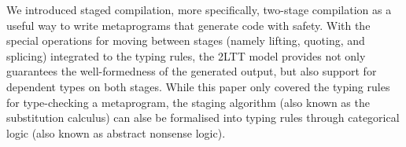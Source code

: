We introduced staged compilation, more specifically, two-stage compilation as a useful way to write metaprograms that generate code with safety. With the special operations for moving between stages (namely lifting, quoting, and splicing) integrated to the typing rules, the 2LTT model provides not only guarantees the well-formedness of the generated output, but also support for dependent types on both stages. While this paper only covered the typing rules for type-checking a metaprogram, the staging algorithm (also known as the substitution calculus) can alse be formalised into typing rules through categorical logic (also known as abstract nonsense logic).
